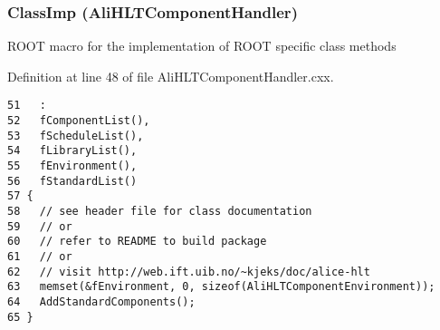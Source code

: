 \subsubsection{\setlength{\rightskip}{0pt plus 5cm}Class\-Imp ({\bf Ali\-HLTComponent\-Handler})}\label{AliHLTComponentHandler_8cxx_a0}


ROOT macro for the implementation of ROOT specific class methods 

Definition at line 48 of file Ali\-HLTComponent\-Handler.cxx.

\footnotesize\begin{verbatim}51   :
52   fComponentList(),
53   fScheduleList(),
54   fLibraryList(),
55   fEnvironment(),
56   fStandardList()
57 {
58   // see header file for class documentation
59   // or
60   // refer to README to build package
61   // or
62   // visit http://web.ift.uib.no/~kjeks/doc/alice-hlt
63   memset(&fEnvironment, 0, sizeof(AliHLTComponentEnvironment));
64   AddStandardComponents();
65 }

\end{verbatim}\normalsize 


